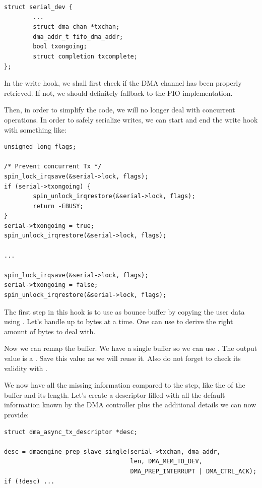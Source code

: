 \begin{verbatim}
struct serial_dev {
        ...
        struct dma_chan *txchan;
        dma_addr_t fifo_dma_addr;
        bool txongoing;
        struct completion txcomplete;
};
\end{verbatim}

In the write hook, we shall first check if the DMA channel has been
properly retrieved. If not, we should definitely fallback to the PIO
implementation.

Then, in order to simplify the code, we will no longer deal with
concurrent operations. In order to safely serialize writes, we can start
and end the write hook with something like:

\begin{verbatim}
unsigned long flags;

/* Prevent concurrent Tx */
spin_lock_irqsave(&serial->lock, flags);
if (serial->txongoing) {
        spin_unlock_irqrestore(&serial->lock, flags);
        return -EBUSY;
}
serial->txongoing = true;
spin_unlock_irqrestore(&serial->lock, flags);

...

spin_lock_irqsave(&serial->lock, flags);
serial->txongoing = false;
spin_unlock_irqrestore(&serial->lock, flags);
\end{verbatim}

The first step in this  hook is to use  as
bounce buffer by copying the user data using . Let's
handle up to  bytes at a time. One can use 
to derive the right amount of bytes to deal with.

Now we can remap the buffer. We have a single buffer so we can use
. The output value is a . Save this
value as we will reuse it. Also do not forget to check its validity with
.

We now have all the missing information compared to the 
step, like the  of the buffer and its length. Let's create a
descriptor filled with all the default information known by the DMA controller
plus the additional details we can now provide:

\begin{verbatim}
struct dma_async_tx_descriptor *desc;

desc = dmaengine_prep_slave_single(serial->txchan, dma_addr,
                                   len, DMA_MEM_TO_DEV,
                                   DMA_PREP_INTERRUPT | DMA_CTRL_ACK);
if (!desc) ...
\end{verbatim}

